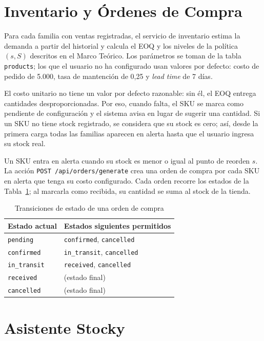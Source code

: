 \documentclass[12pt, a4paper]{report}
\begin{document}
\section{Inventario y Órdenes de Compra}

Para cada familia con ventas registradas, el servicio de inventario estima la demanda a
partir del historial y calcula el EOQ y los niveles de la política $(s, S)$ descritos en el
Marco Teórico. Los parámetros se toman de la tabla \texttt{products}; los que el usuario no
ha configurado usan valores por defecto: costo de pedido de 5.000, tasa de mantención de
0,25 y \textit{lead time} de 7 días.

El costo unitario no tiene un valor por defecto razonable: sin él, el EOQ entrega
cantidades desproporcionadas. Por eso, cuando falta, el SKU se marca como pendiente de
configuración y el sistema avisa en lugar de sugerir una cantidad. Si un SKU no tiene stock
registrado, se considera que su stock es cero; así, desde la primera carga todas las
familias aparecen en alerta hasta que el usuario ingresa su stock real.

Un SKU entra en alerta cuando su stock es menor o igual al punto de reorden $s$. La acción
\texttt{POST /api/orders/generate} crea una orden de compra por cada SKU en alerta que
tenga su costo configurado. Cada orden recorre los estados de la
Tabla~\ref{tab:estados-orden}; al marcarla como recibida, su cantidad se suma al stock de
la tienda.

\begin{table}[H]
  \centering
  \caption{Transiciones de estado de una orden de compra}
  \label{tab:estados-orden}
  \small
  \begin{tabular}{|l|l|}
    \hline
    \textbf{Estado actual} & \textbf{Estados siguientes permitidos} \\
    \hline
    \texttt{pending}    & \texttt{confirmed}, \texttt{cancelled} \\
    \texttt{confirmed}  & \texttt{in\_transit}, \texttt{cancelled} \\
    \texttt{in\_transit} & \texttt{received}, \texttt{cancelled} \\
    \texttt{received}   & (estado final) \\
    \texttt{cancelled}  & (estado final) \\
    \hline
  \end{tabular}
\end{table}

\section{Asistente Stocky}
\end{document}
